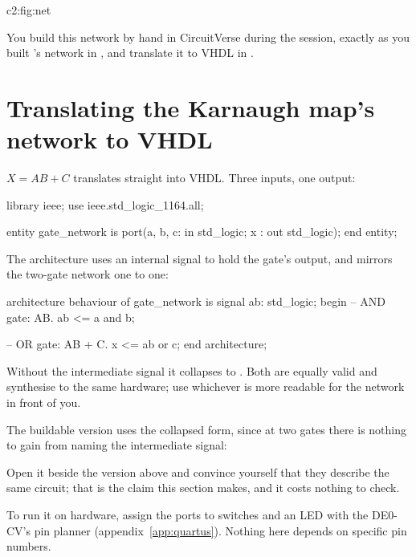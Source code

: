 {c2:fig:net}

You build this network by hand in CircuitVerse during the session, exactly as you built
's network in , and translate it to VHDL in .

\section{Translating the Karnaugh map's network to VHDL}
\label{c2:sec:tovhdl}

$X = AB + C$ translates straight into VHDL. Three inputs, one output:

\begin{vhdlcode}
library ieee;
use ieee.std_logic_1164.all;

entity gate_network is
    port(a, b, c: in std_logic;
         x      : out std_logic);
end entity;
\end{vhdlcode}

The architecture uses an internal signal  to hold the  gate's output, and
mirrors the two-gate network one to one:

\begin{vhdlcode}
architecture behaviour of gate_network is
signal ab: std_logic;
begin
    -- AND gate: AB.
    ab <= a and b;

    -- OR gate: AB + C.
    x <= ab or c;
end architecture;
\end{vhdlcode}

Without the intermediate signal it collapses to . Both are equally
valid and synthesise to the same hardware; use whichever is more readable for the network in front
of you.

The buildable version uses the collapsed form, since at two gates there is nothing to gain from
naming the intermediate signal:


Open it beside the version above and convince yourself that they describe the same circuit; that is
the claim this section makes, and it costs nothing to check.

To run it on hardware, assign the ports to switches and an LED with the DE0-CV's pin planner
(appendix~\ref{app:quartus}). Nothing here depends on specific pin numbers.

